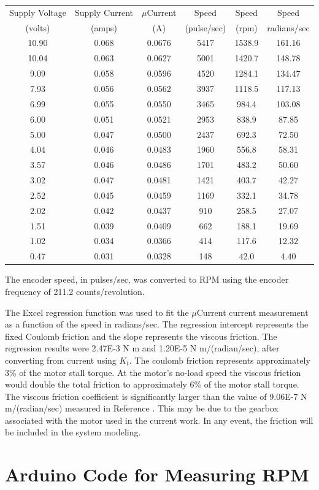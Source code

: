 \documentclass[12pt,letterpaper]{article}
\begin{document}
\begin{appendices}
\begin{tabular}{|c|c|c|c|c|c|}
Supply Voltage & Supply Current & $\mu$Current & Speed & Speed & Speed\\
(volts) & (amps) & (A) & (pulse/sec) & (rpm) & radians/sec\\
\hline
10.90 & 0.068 & 0.0676 & 5417 & 1538.9 & 161.16\\
10.04 & 0.063 & 0.0627 & 5001 & 1420.7 & 148.78\\
9.09 & 0.058 & 0.0596 & 4520 & 1284.1 & 134.47\\
7.93 & 0.056 & 0.0562 & 3937 & 1118.5 & 117.13\\
6.99 & 0.055 & 0.0550 & 3465 & 984.4 & 103.08\\
6.00 & 0.051 & 0.0521 & 2953 & 838.9 & 87.85\\
5.00 & 0.047 & 0.0500 & 2437 & 692.3 & 72.50\\
4.04 & 0.046 & 0.0483 & 1960 & 556.8 & 58.31\\
3.57 & 0.046 & 0.0486 & 1701 & 483.2 & 50.60\\
3.02 & 0.047 & 0.0481 & 1421 & 403.7 & 42.27\\
2.52 & 0.045 & 0.0459 & 1169 & 332.1 & 34.78\\
2.02 & 0.042 & 0.0437 & 910 & 258.5 & 27.07\\
1.51 & 0.039 & 0.0409 & 662 & 188.1 & 19.69\\
1.02 & 0.034 & 0.0366 & 414 & 117.6 & 12.32\\
0.47 & 0.031 & 0.0328 & 148 & 42.0 & 4.40\\
\end{tabular}

The encoder speed, in pulses/sec, was converted to RPM using the encoder frequency of 211.2
counts/revolution.

The Excel regression function was used to fit the $\mu$Current current measurement as a function
of the speed in radians/sec.  The regression intercept represents the fixed Coulomb friction and the
slope represents the viscous friction.  The regression results were 2.47E-3 N m and 1.20E-5 N m/(radian/sec),
after converting from current using $K_{t}$.  The coulomb friction represents approximately 3\% of the 
motor stall torque.  At the motor's no-load speed the viscous friction would double the total friction to 
approximately 6\% of the motor stall torque.  The viscous friction coefficient is significantly larger than
the value of 9.06E-7 N m/(radian/sec) measured in Reference \cite{twoWheeled}.  This may be due to
the gearbox associated with the motor used in the current work.  In any event, the friction will be included
in the system modeling.


\section{Arduino Code for Measuring RPM}




\end{appendices}
\end{document}
